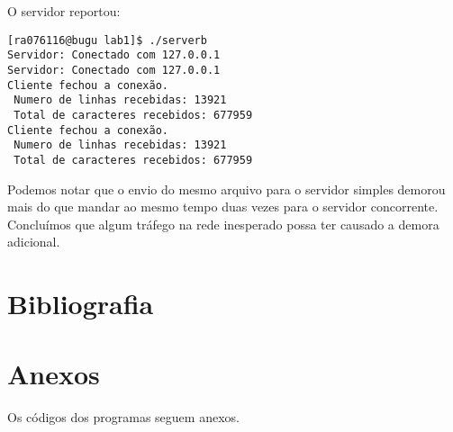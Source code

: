 \documentclass[12pt,a4paper]{article}
\begin{document}
O servidor reportou:

\begin{verbatim}
[ra076116@bugu lab1]$ ./serverb 
Servidor: Conectado com 127.0.0.1
Servidor: Conectado com 127.0.0.1
Cliente fechou a conexão.
 Numero de linhas recebidas: 13921
 Total de caracteres recebidos: 677959
Cliente fechou a conexão.
 Numero de linhas recebidas: 13921
 Total de caracteres recebidos: 677959
\end{verbatim}

Podemos notar que o envio do mesmo arquivo para o servidor simples
demorou mais do que mandar ao mesmo tempo duas vezes para o servidor
concorrente. Concluímos que algum tráfego na rede inesperado possa ter
causado a demora adicional.

\section{Bibliografia}



\section{Anexos}

Os códigos dos programas seguem anexos.
\end{document}
